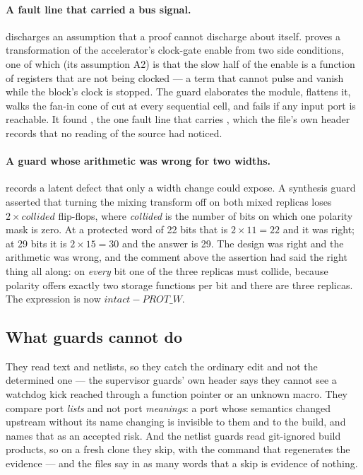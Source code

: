 \paragraph{A fault line that carried a bus signal.}
 discharges an assumption that a
proof cannot discharge about itself. 
proves a transformation of the accelerator's clock-gate enable from two
side conditions, one of which (its assumption A2) is that the slow half
of the enable is a function of registers that are not being clocked ---
a term that cannot pulse and vanish while the block's clock is stopped.
The guard elaborates the module, flattens it, walks the fan-in cone of
 cut at every sequential cell, and fails if any
input port is reachable. It found , the one fault line
that carries , which the file's own header records that no
reading of the source had noticed.

\paragraph{A guard whose arithmetic was wrong for two widths.}
 records a latent defect that only a width change
could expose. A synthesis guard asserted that turning the mixing
transform off on both mixed replicas loses $2 \times \mathit{collided}$
flip-flops, where \emph{collided} is the number of bits on which one
polarity mask is zero. At a protected word of 22 bits that is
$2 \times 11 = 22$ and it was right; at 29 bits it is $2 \times 15 = 30$
and the answer is 29. The design was right and the arithmetic was wrong,
and the comment above the assertion had said the right thing all along:
on \emph{every} bit one of the three replicas must collide, because
polarity offers exactly two storage functions per bit and there are three
replicas. The expression is now $\mathit{intact} - \mathit{PROT\_W}$.

\subsection{What guards cannot do}

They read text and netlists, so they catch the ordinary edit and not the
determined one --- the supervisor guards' own header says they cannot
see a watchdog kick reached through a function pointer or an unknown
macro. They compare port \emph{lists} and not port \emph{meanings}: a
port whose semantics changed upstream without its name changing is
invisible to them and to the build, and  names that
as an accepted risk. And the netlist guards read git-ignored build
products, so on a fresh clone they skip, with the command that
regenerates the evidence --- and the files say in as many words that a
skip is evidence of nothing.

